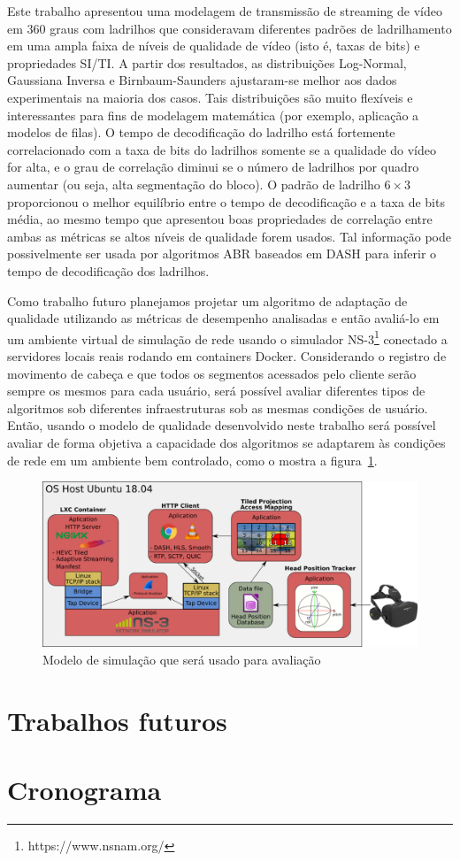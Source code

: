 Este trabalho apresentou uma modelagem de transmissão de streaming de vídeo em 360 graus com ladrilhos que consideravam diferentes padrões de ladrilhamento em uma ampla faixa de níveis de qualidade de vídeo (isto é, taxas de bits) e propriedades SI/TI. A partir dos resultados, as distribuições Log-Normal, Gaussiana Inversa e Birnbaum-Saunders ajustaram-se melhor aos dados experimentais na maioria dos casos. Tais distribuições são muito flexíveis e interessantes para fins de modelagem matemática (por exemplo, aplicação a modelos de filas). O tempo de decodificação do ladrilho está fortemente correlacionado com a taxa de bits do ladrilhos somente se a qualidade do vídeo for alta, e o grau de correlação diminui se o número de ladrilhos por quadro aumentar (ou seja, alta segmentação do bloco). O padrão de ladrilho $6 \times 3$ proporcionou o melhor equilíbrio entre o tempo de decodificação e a taxa de bits média, ao mesmo tempo que apresentou boas propriedades de correlação entre ambas as métricas se altos níveis de qualidade forem usados. Tal informação pode possivelmente ser usada por algoritmos ABR baseados em DASH para inferir o tempo de decodificação dos ladrilhos.

Como trabalho futuro planejamos projetar um algoritmo de adaptação de qualidade utilizando as métricas de desempenho analisadas e então avaliá-lo em um ambiente virtual de simulação de rede usando o simulador NS-3\footnote{https://www.nsnam.org/} conectado a servidores locais reais rodando em containers Docker. Considerando o registro de movimento de cabeça e que todos os segmentos acessados pelo cliente serão sempre os mesmos para cada usuário, será possível avaliar diferentes tipos de algoritmos sob diferentes infraestruturas sob as mesmas condições de usuário. Então, usando o modelo de qualidade desenvolvido neste trabalho será possível avaliar de forma objetiva a capacidade dos algoritmos se adaptarem às condições de rede em um ambiente bem controlado, como o mostra a figura~\ref{fig:modelo_simulação}.

\begin{figure}[htb]
        \centering
        \includegraphics[width=0.8\linewidth]{fig/modelo_simulação.png}
        \caption{Modelo de simulação que será usado para avaliação}
        \label{fig:modelo_simulação}
\end{figure}


\section{Trabalhos futuros}

\section{Cronograma}


